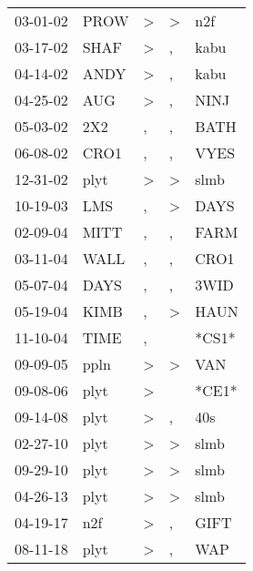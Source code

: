 \begin{supertabular}{lllll}
 03-01-02 &  PROW &     \textgreater &     \textgreater &    n2f \\
 03-17-02 &  SHAF &     \textgreater &                , &   kabu \\
 04-14-02 &  ANDY &     \textgreater &                , &   kabu \\
 04-25-02 &   AUG &     \textgreater &                , &   NINJ \\
 05-03-02 &   2X2 &                , &                , &   BATH \\
 06-08-02 &  CRO1 &                , &                , &   VYES \\
 12-31-02 &  plyt &     \textgreater &     \textgreater &   slmb \\
 10-19-03 &   LMS &                , &     \textgreater &   DAYS \\
 02-09-04 &  MITT &                , &                , &   FARM \\
 03-11-04 &  WALL &                , &                , &   CRO1 \\
 05-07-04 &  DAYS &                , &                , &   3WID \\
 05-19-04 &  KIMB &                , &     \textgreater &   HAUN \\
 11-10-04 &  TIME &                , &                  &  *CS1* \\
 09-09-05 &  ppln &     \textgreater &     \textgreater &    VAN \\
 09-08-06 &  plyt &     \textgreater &                  &  *CE1* \\
 09-14-08 &  plyt &     \textgreater &                , &    40s \\
 02-27-10 &  plyt &     \textgreater &     \textgreater &   slmb \\
 09-29-10 &  plyt &     \textgreater &     \textgreater &   slmb \\
 04-26-13 &  plyt &     \textgreater &     \textgreater &   slmb \\
 04-19-17 &   n2f &     \textgreater &                , &   GIFT \\
 08-11-18 &  plyt &     \textgreater &                , &    WAP \\
\end{supertabular}
